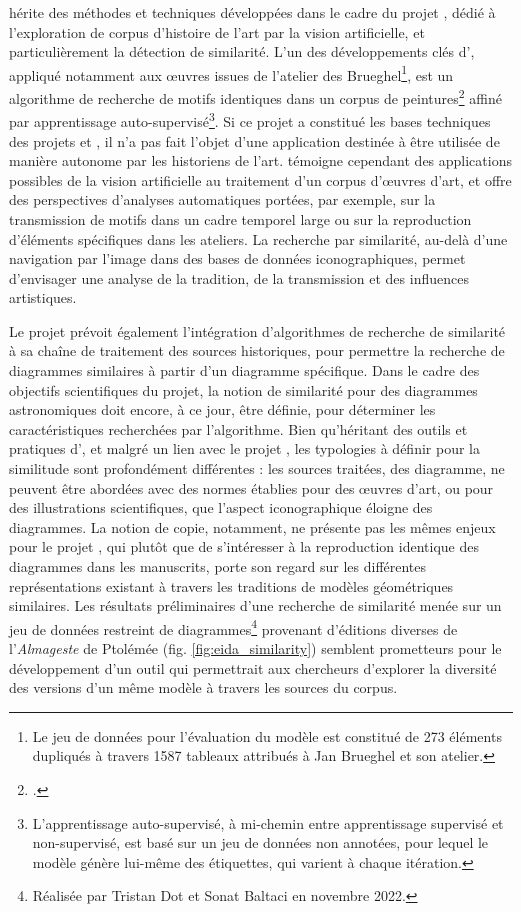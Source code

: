 \vhs hérite des méthodes et techniques développées dans le cadre du projet \enherit, dédié à l'exploration de corpus d'histoire de l'art par la vision artificielle, et particulièrement la détection de similarité. L'un des développements clés d'\enherit, appliqué notamment aux œuvres issues de l'atelier des Brueghel\footnote{Le jeu de données pour l'évaluation du modèle est constitué de 273 éléments dupliqués à travers 1587 tableaux attribués à Jan Brueghel et son atelier.}, est un algorithme de recherche de motifs identiques dans un corpus de peintures\footcite{shenDiscoveringVisualPatterns2019} affiné par apprentissage auto-supervisé\footnote{L'apprentissage auto-supervisé, à mi-chemin entre apprentissage supervisé et non-supervisé, est basé sur un jeu de données non annotées, pour lequel le modèle génère lui-même des étiquettes, qui varient à chaque itération.}. Si ce projet a constitué les bases techniques des projets \eida et \vhs, il n'a pas fait l'objet d'une application destinée à être utilisée de manière autonome par les historiens de l'art. \enherit témoigne cependant des applications possibles de la vision artificielle au traitement d'un corpus d'œuvres d'art, et offre des perspectives d'analyses automatiques portées, par exemple, sur la transmission de motifs dans un cadre temporel large ou sur la reproduction d'éléments spécifiques dans les ateliers. La recherche par similarité, au-delà d'une navigation par l'image dans des bases de données iconographiques, permet d'envisager une analyse de la tradition, de la transmission et des influences artistiques.

Le projet \eida prévoit également l'intégration d'algorithmes de recherche de similarité à sa chaîne de traitement des sources historiques, pour permettre la recherche de diagrammes similaires à partir d'un diagramme spécifique. Dans le cadre des objectifs scientifiques du projet, la notion de similarité pour des diagrammes astronomiques doit encore, à ce jour, être définie, pour déterminer les caractéristiques recherchées par l'algorithme. Bien qu'héritant des outils et pratiques d'\enherit, et malgré un lien avec le projet \vhs, les typologies à définir pour la similitude sont profondément différentes : les sources traitées, des diagramme, ne peuvent être abordées avec des normes établies pour des œuvres d'art, ou pour des illustrations scientifiques, que l'aspect iconographique éloigne des diagrammes. La notion de copie, notamment, ne présente pas les mêmes enjeux pour le projet \eida, qui plutôt que de s'intéresser à la reproduction identique des diagrammes dans les manuscrits, porte son regard sur les différentes représentations existant à travers les traditions de modèles géométriques similaires. Les résultats préliminaires d'une recherche de similarité menée sur un jeu de données restreint de diagrammes\footnote{Réalisée par Tristan Dot et Sonat Baltaci en novembre 2022.} provenant d'éditions diverses de l'\textit{Almageste} de Ptolémée (fig. \ref{fig:eida_similarity}) semblent prometteurs pour le développement d'un outil qui permettrait aux chercheurs d'explorer la diversité des versions d'un même modèle à travers les sources du corpus.

